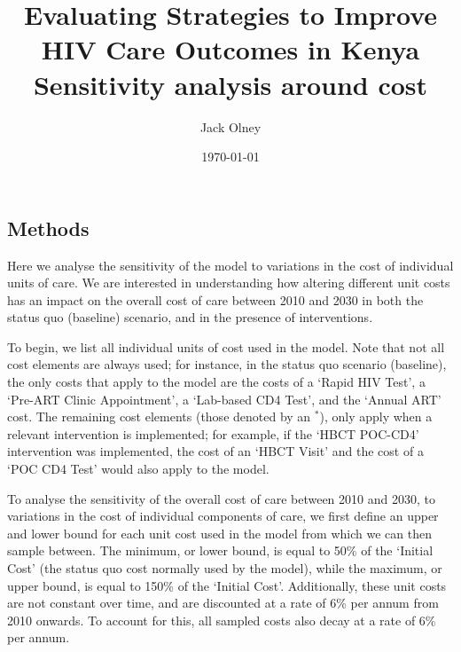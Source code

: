 \documentclass[a4paper]{article}
\begin{document}

\title{\textbf{Evaluating Strategies to Improve HIV Care Outcomes in Kenya} \\ Sensitivity analysis around cost}

\author[1]{Jack Olney}


\date{\today{}}

\maketitle{}

\subsection*{Methods}
\label{Methods}

Here we analyse the sensitivity of the model to variations in the cost of individual units of care. We are interested in understanding how altering different unit costs has an impact on the overall cost of care between 2010 and 2030 in both the status quo (baseline) scenario, and in the presence of interventions.

To begin, we list all individual units of cost used in the model. Note that not all cost elements are always used; for instance, in the status quo scenario (baseline), the only costs that apply to the model are the costs of a `Rapid HIV Test', a `Pre-ART Clinic Appointment', a `Lab-based CD4 Test', and the `Annual ART' cost. The remaining cost elements (those denoted by an $^*$), only apply when a relevant intervention is implemented; for example, if the `HBCT POC-CD4' intervention was implemented, the cost of an `HBCT Visit' and the cost of a `POC CD4 Test' would also apply to the model.

To analyse the sensitivity of the overall cost of care between 2010 and 2030, to variations in the cost of individual components of care, we first define an upper and lower bound for each unit cost used in the model from which we can then sample between. The minimum, or lower bound, is equal to 50\% of the `Initial Cost' (the status quo cost normally used by the model), while the maximum, or upper bound, is equal to 150\% of the `Initial Cost'. Additionally, these unit costs are not constant over time, and are discounted at a rate of 6\% per annum from 2010 onwards. To account for this, all sampled costs also decay at a rate of 6\% per annum.
\end{document}
